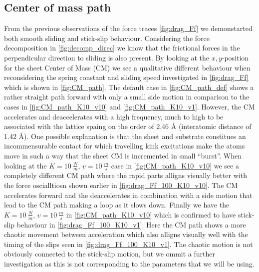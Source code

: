 \subsection{Center of mass path}
From the previous observations of the force traces \cref{fig:drag_Ff} we
demonstarted both smooth sliding and stick-slip behaviour. Considering the force
decomposition in \cref{fig:decomp_direc} we know that the frictional forces in
the perpendicular direction to sliding is also present. By looking at the
$x,y$-position for the sheet Center of Mass (\acrshort{CM}) we see a qualitative
different behaviour when reconsidering the spring constant and sliding speed
investigated in \cref{fig:drag_Ff} which is shown in \cref{fig:CM_path}. The
default case in \cref{fig:CM_path_def} shows a rather straight path forward with
only a small side motion in comparison to the cases in
\cref{fig:CM_path_K10_v10} and \cref{fig:CM_path_K10_v1}. However, the
\acrshort{CM} accelerates and deaccelerates with a high frequency, much to high
to be associated with the lattice spaing on the order of 2.46 Å (interatomic
distance of 1.42 Å). One possible explanation is that the sheet and substrate
constitues an incommensurable contact for which travelling kink excitations make
the atoms move in such a way that the sheet \acrshort{CM} is incremented in
small ``burst''. When looking at the $K = \SI{10}{\frac{N}{m}}$, $v =
\SI{10}{\frac{m}{s}}$ case in \cref{fig:CM_path_K10_v10} we see a completely
different \acrshort{CM} path where the rapid parts alligns visually better with
the force oscialltiosn shown earlier in \cref{fig:drag_Ff_100_K10_v10}. The
\acrshort{CM} accelerates forward and the deaccelerates in combination with a
side motion that lead to the \acrshort{CM} path making a loop as it slows down.
Finally we have the $K = \SI{10}{\frac{N}{m}}$, $v = \SI{10}{\frac{m}{s}}$ in
\cref{fig:CM_path_K10_v10} which is confirmed to have stick-slip behaviour in
\cref{fig:drag_Ff_100_K10_v1}. Here the \acrshort{CM} path shows a more chaotic
movement between acceleration which also alligns visually well with the timing
of the slips seen in \cref{fig:drag_Ff_100_K10_v1}. The chaotic motion is not
obviously connected to the stick-slip motion, but we ommit a further
investigation as this is not corresponding to the parameters that we will be
using. 


